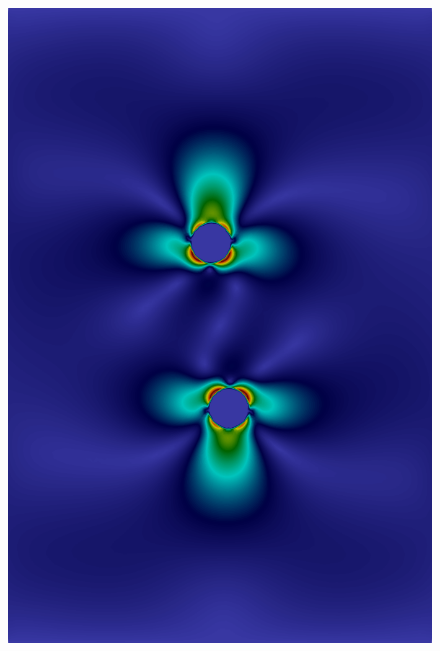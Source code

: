 \documentclass[graybox]{svmult}
\begin{document}
\begin{figure}
	\includegraphics[scale=0.14]{Figures/squirmer/t=0.1.png}

\end{figure}
\end{document}
